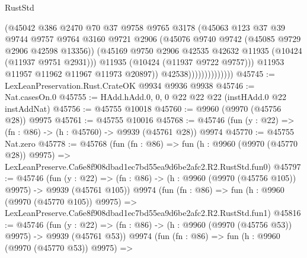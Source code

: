 \begin{lexlean}{RustStd}
\begin{coremodule}
                                  (@45042
                                    @386
                                    @2470
                                    @70
                                    @37
                                    @9758
                                    @9765
                                    @3178
                                    (@45063
                                      @123
                                      @37
                                      @39
                                      @9744
                                      @9757
                                      @9764
                                      @3160
                                      @9721
                                      @2906
                                      (@45076 @9740 @9742 (@45085 @9729 @2906 @42598 @13356))
                                      (@45169
                                        @9750
                                        @2906
                                        @42535
                                        @42632
                                        @11935
                                        (@10424 (@11937 @9751 @2931)))
                                      @11935
                                      (@10424 (@11937 @9722 @9757)))
                                    @11953
                                    @11957
                                    @11962
                                    @11967
                                    @11973
                                    @20897))
                                @42538))))))))))))))
@45745 := LexLeanPreservation.Rust.CrateOK @9934 @9936 @9938
@45746 := Nat.casesOn.{0}
@45755 := HAdd.hAdd.{0, 0, 0} @22 @22 @22 (instHAdd.{0} @22 instAddNat)
@45756 := @45755 @10018
@45760 := @9960 (@9970 (@45756 @28)) @9975
@45761 := @45755 @10016
@45768 := @45746 (fun (y : @22) => (fn : @86) -> (h : @45760) -> @9939 (@45761 @28)) @9974
@45770 := @45755 Nat.zero
@45778 := @45768
    (fun (fn : @86) =>
    fun (h : @9960 (@9970 (@45770 @28)) @9975) =>
    LexLeanPreserve.Ca6e8f908dbad1ec7bd55ea9d6be2afc2.R2.RustStd.fun0)
@45797 := @45746
    (fun (y : @22) => (fn : @86) -> (h : @9960 (@9970 (@45756 @105)) @9975) -> @9939 (@45761 @105))
    @9974
    (fun (fn : @86) =>
    fun (h : @9960 (@9970 (@45770 @105)) @9975) =>
    LexLeanPreserve.Ca6e8f908dbad1ec7bd55ea9d6be2afc2.R2.RustStd.fun1)
@45816 := @45746
    (fun (y : @22) => (fn : @86) -> (h : @9960 (@9970 (@45756 @53)) @9975) -> @9939 (@45761 @53))
    @9974
    (fun (fn : @86) =>
    fun (h : @9960 (@9970 (@45770 @53)) @9975) =>

\end{coremodule}
\end{lexlean}
